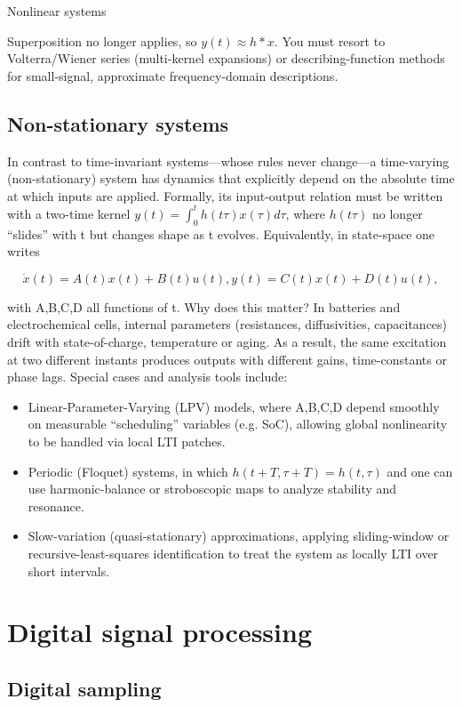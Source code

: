 Nonlinear systems

Superposition no longer applies, so $y(t) \approx h * x$.
You must resort to Volterra/Wiener series (multi-kernel expansions) or describing-function methods for small-signal, approximate frequency-domain descriptions.

\subsection{Non-stationary systems}
In contrast to time-invariant systems—whose rules never change—a time-varying (non-stationary) system has dynamics that explicitly depend on the absolute time at which inputs are applied. Formally, its input-output relation must be written with a two-time kernel $y(t)=\int _{0}^t h(t\tau)x(\tau)d\tau$,
where $h(t\tau)$ no longer “slides” with t but changes shape as t evolves. Equivalently, in state-space one writes

$$
\dot{x}(t)=A(t)x(t)+B(t)u(t),
y(t)=C(t)x(t)+D(t)u(t),
$$

with A,B,C,D all functions of t.
Why does this matter? In batteries and electrochemical cells, internal parameters (resistances, diffusivities, capacitances) drift with state-of-charge, temperature or aging. As a result, the same excitation at two different instants produces outputs with different gains, time-constants or phase lags.
Special cases and analysis tools include:
\begin{itemize}
    \item Linear-Parameter-Varying (LPV) models, where A,B,C,D depend smoothly on measurable “scheduling” variables (e.g. SoC), allowing global nonlinearity to be handled via local LTI patches.
    \item Periodic (Floquet) systems, in which $h(t+T,\tau+T)=h(t,\tau)$ and one can use harmonic-balance or stroboscopic maps to analyze stability and resonance.
    \item Slow-variation (quasi-stationary) approximations, applying sliding-window or recursive-least-squares identification to treat the system as locally LTI over short intervals.
\end{itemize}

\section{Digital signal processing}

\subsection{Digital sampling}

